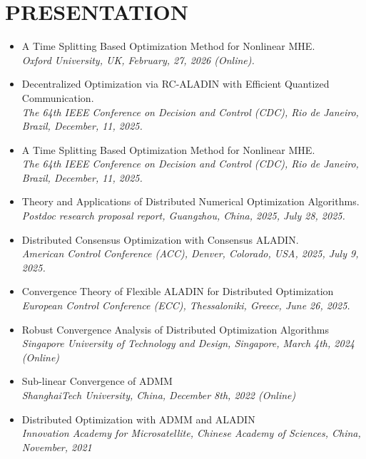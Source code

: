 \documentclass[paper=a4,fontsize=11pt]{scrartcl} %
\newcommand{\NewPart}[1]{\section*{\uppercase{#1}}}
\begin{document}
\NewPart{PRESENTATION}{}
\begin{itemize}
\item  {
	{A Time Splitting Based Optimization Method for Nonlinear MHE.}\\
	\emph{Oxford University, UK, February, 27, 2026 (Online).
} }

\item  {
	{ Decentralized Optimization via RC-ALADIN with Efficient Quantized Communication.}\\
	\emph{The 64th IEEE Conference on Decision and Control (CDC), Rio de Janeiro, Brazil, December, 11, 2025.
} }

\item  {
	{A Time Splitting Based Optimization Method for Nonlinear MHE.}\\
	\emph{The 64th IEEE Conference on Decision and Control (CDC), Rio de Janeiro, Brazil, December, 11, 2025.
} }

\item  {
	{ Theory and Applications of Distributed Numerical Optimization Algorithms.}\\
	\emph{Postdoc research proposal report, Guangzhou,  China, 2025, July 28, 2025.
} }

\item  {
	{ Distributed Consensus Optimization with Consensus ALADIN.}\\
	\emph{American Control Conference (ACC), Denver, Colorado, USA, 2025, July 9, 2025.
} }

	
		\item  {
		{ Convergence Theory of Flexible ALADIN for Distributed Optimization}\\
		\emph{European Control Conference (ECC), Thessaloniki, Greece, June 26, 2025.
	} }
		\item  {
		{Robust Convergence Analysis of Distributed Optimization Algorithms}\\
		\emph{Singapore University of Technology and Design, Singapore, March 4th, 2024 (Online)
	} }
	
		\item  {
		{Sub-linear Convergence of ADMM}\\
		\emph{ShanghaiTech University, China, December 8th, 2022 (Online)
	} }
	
	\item  {
		{Distributed Optimization with ADMM and ALADIN}\\
		\emph{Innovation Academy for Microsatellite, Chinese Academy of Sciences, China,
			November, 2021
	} }
	

\end{itemize}
\end{document}
